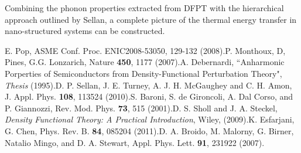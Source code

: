 \documentclass{article}
\numberwithin{equation}{section}
\begin{document}
Combining the phonon properties extracted from DFPT with the hierarchical approach outlined by Sellan, a complete picture of the thermal energy transfer in nano-structured systems can be constructed.\\
\newpage
\begin{spacing}{1.0}
\small
\noindent[1] E. Pop, ASME Conf. Proc. ENIC2008-53050, 129-132 (2008).\newline
[2] P. Monthoux, D, Pines, G.G. Lonzarich, Nature \textbf{450}, 1177 (2007).\newline
[3] A. Debernardi, ``Anharmonic Porperties of Semiconductors from Density-Functional Perturbation Theory", \textit{Thesis} (1995).\newline
[4] D. P. Sellan, J. E. Turney, A. J. H. McGaughey and C. H. Amon, J. Appl. Phys. \textbf{108}, 113524 (2010).\newline
[5] S. Baroni, S. de Gironcoli, A. Dal Corso, and P. Giannozzi, Rev. Mod. Phys. \textbf{73}, 515 (2001).\newline
[6] D. S. Sholl and J. A. Steckel, \textit{Density Functional Theory: A Practical Introduction}, Wiley, (2009).\newline
[7] K. Esfarjani, G. Chen, Phys. Rev. B. \textbf{84}, 085204 (2011).\newline
[8] D. A. Broido, M. Malorny, G. Birner, Natalio Mingo, and D. A. Stewart, Appl. Phys. Lett. \textbf{91}, 231922 (2007).\newline

\end{spacing}
\end{document}
